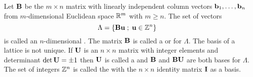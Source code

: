 \documentclass[10pt,twocolumn,twoside]{IEEEtran}
\begin{document}
Let $\mathbf{B}$ be the $m\times n$ matrix with linearly independent column vectors $\mathbf{b}_1,\dots,\mathbf{b}_n$ from $m$-dimensional Euclidean space ${\mathbb R}^m$ with $m\geq n$. The set of vectors
\[
\Lambda=\{ \mathbf{B}\mathbf{u} \; ; \; \mathbf{u} \in {\mathbb Z}^n \}
\]
is called an $n$-dimensional .
The matrix $\mathbf{B}$ is called a  or  for $\Lambda$.  The basis of a lattice is not unique. If $\mathbf{U}$ is an $n \times n$ matrix with integer elements and determinant $\det\mathbf{U}=\pm 1$ then  $\mathbf{U}$ is called a  and $\mathbf{B}$ and $\mathbf{B}\mathbf{U}$ are both bases for $\Lambda$.  %
The set of integers ${\mathbb Z}^n$ is called the  with the $n\times n$ identity matrix $\mathbf{I}$ as a basis.
\end{document}
